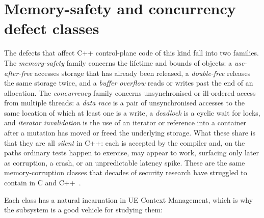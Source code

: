 \documentclass[english,oneside,a4paper,censored,csm,software-track-2020]{HYthesisML}
\begin{document}
\section{Memory-safety and concurrency defect classes}\label{sec:defects}
The defects that affect C++ control-plane code of this kind fall into two families. The
\emph{memory-safety} family concerns the lifetime and bounds of objects: a \emph{use-after-free}
accesses storage that has already been released, a \emph{double-free} releases the same storage
twice, and a \emph{buffer overflow} reads or writes past the end of an allocation. The
\emph{concurrency} family concerns unsynchronised or ill-ordered access from multiple threads: a
\emph{data race} is a pair of unsynchronised accesses to the same location of which at least one
is a write, a \emph{deadlock} is a cyclic wait for locks, and \emph{iterator invalidation} is
the use of an iterator or reference into a container after a mutation has moved or freed the
underlying storage. What these share is that they are all \emph{silent} in C++: each is accepted
by the compiler and, on the paths ordinary tests happen to exercise, may appear to work,
surfacing only later as corruption, a crash, or an unpredictable latency spike. These are the
same memory-corruption classes that decades of security research have struggled to contain in C
and C++~\cite{szekeres2013sok}.

Each class has a natural incarnation in UE Context Management, which is why the subsystem is a
good vehicle for studying them:
\end{document}
